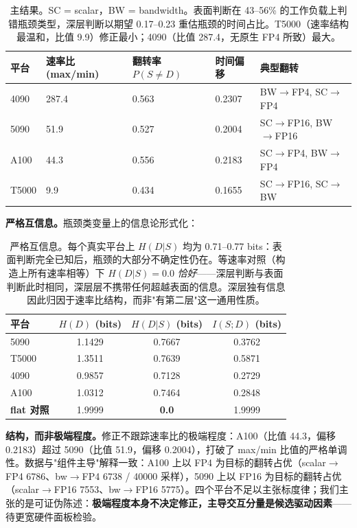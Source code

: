 \documentclass[12pt]{ctexart}
\begin{document}
\begin{table}[t]
\centering
\begin{tabular}{@{}lllll@{}}
\toprule
平台 & 速率比 (max/min) & 翻转率 $P(S\neq D)$ & 时间偏移 & 典型翻转 \\
\midrule
4090 & 287.4 & 0.563 & 0.2307 & BW$\to$FP4, SC$\to$FP4 \\
5090 & 51.9 & 0.527 & 0.2004 & SC$\to$FP16, BW$\to$FP16 \\
A100 & 44.3 & 0.556 & 0.2183 & SC$\to$FP4, BW$\to$FP4 \\
T5000 & 9.9 & 0.434 & 0.1655 & SC$\to$FP16, SC$\to$BW \\
\bottomrule
\end{tabular}
\caption{主结果。SC = scalar，BW = bandwidth。表面判断在 43--56\% 的工作负载上判错瓶颈类型，深层判断以期望 0.17--0.23 重估瓶颈的时间占比。T5000（速率结构最温和，比值 9.9）修正最小；4090（比值 287.4，无原生 FP4 所致）最大。}
\label{tab:main}
\end{table}

\textbf{严格互信息。}瓶颈类变量上的信息论形式化：

\begin{table}[t]
\centering
\begin{tabular}{@{}lccc@{}}
\toprule
平台 & $H(D)$ (bits) & $H(D|S)$ (bits) & $I(S;D)$ (bits) \\
\midrule
5090 & 1.1429 & 0.7667 & 0.3762 \\
T5000 & 1.3511 & 0.7639 & 0.5871 \\
4090 & 0.9857 & 0.7128 & 0.2729 \\
A100 & 1.0312 & 0.7464 & 0.2848 \\
\textbf{flat 对照} & 1.9999 & \textbf{0.0} & 1.9999 \\
\bottomrule
\end{tabular}
\caption{严格互信息。每个真实平台上 $H(D|S)$ 均为 0.71--0.77 bits：表面判断完全已知后，瓶颈的大部分不确定性仍在。等速率对照（构造上所有速率相等）下 $H(D|S) = 0.0$ \emph{恰好}——深层判断与表面判断此时相同，深层层不携带任何超越表面的信息。深层独有信息因此归因于速率比结构，而非"有第二层"这一通用性质。}
\label{tab:mi}
\end{table}

\textbf{结构，而非极端程度。}修正不跟踪速率比的极端程度：A100（比值 44.3，偏移 0.2183）超过 5090（比值 51.9，偏移 0.2004），打破了 max/min 比值的严格单调性。数据与"组件主导"解释一致：A100 上以 FP4 为目标的翻转占优（scalar$\to$FP4 6786、bw$\to$FP4 6738 / 40000 采样），5090 上以 FP16 为目标的翻转占优（scalar$\to$FP16 7553、bw$\to$FP16 5775）。四个平台不足以主张标度律；我们主张的是可证伪陈述：\textbf{极端程度本身不决定修正，主导交互分量是候选驱动因素}——待更宽硬件面板检验。
\end{document}
